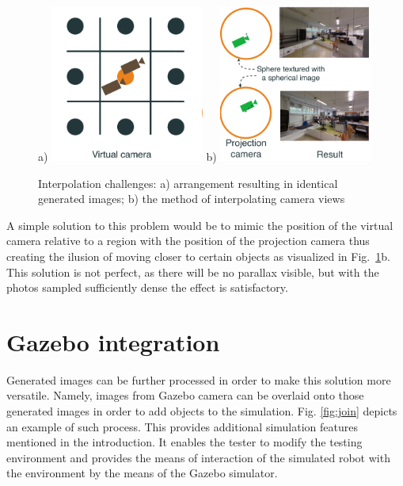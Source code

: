 \documentclass{svproc}
\begin{document}
\begin{figure}[!ht]
    \centering
    a) \includegraphics[width=0.45\textwidth]{img/interpolation/virt.pdf}
    b) \includegraphics[width=0.45\textwidth]{img/interpolation/proj.pdf}
    \caption{Interpolation challenges: a) arrangement resulting in identical generated images; b) the method of interpolating camera views}
    \label{fig:interpolation}
\end{figure}

A simple solution to this problem would be to mimic the position of the virtual camera relative 
to a region with the position of the projection camera thus creating the ilusion of moving closer 
to certain objects as visualized in Fig.~\ref{fig:interpolation}b. This solution is not perfect,
as there will be no parallax visible, but with the photos sampled sufficiently dense the effect is 
satisfactory.

\section{Gazebo integration}
\label{sec:gazebo}

Generated images can be further processed in order to make this solution more versatile.
Namely, images from Gazebo camera can be overlaid onto those generated images in order to add objects to the simulation.
Fig. \ref{fig:join} depicts an example of such process.
This provides additional simulation features mentioned in the introduction.
It enables the tester to modify the testing environment and provides the means of interaction of the simulated robot with the environment by the means of the Gazebo simulator.
\end{document}
